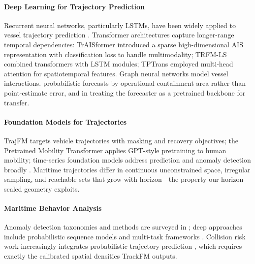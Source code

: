 \documentclass{article}
\begin{document}
\paragraph{Deep Learning for Trajectory Prediction}
Recurrent neural networks, particularly LSTMs, have been widely applied to
vessel trajectory prediction \citep{nguyen2018geotracknet}. Transformer
architectures capture longer-range temporal dependencies: TrAISformer
\citep{nguyen2021traisformer} introduced a sparse high-dimensional AIS
representation with classification loss to handle multimodality; TRFM-LS
\citep{jiang2023trfmls} combined transformers with LSTM modules; TPTrans
\citep{ouyang2024tptrans} employed multi-head attention for spatiotemporal
features. Graph neural networks model vessel interactions.
probabilistic forecasts by operational containment area rather than
point-estimate error, and in treating the forecaster as a pretrained
backbone for transfer.

\paragraph{Foundation Models for Trajectories}
TrajFM \citep{lin2024trajfm} targets vehicle trajectories with masking and
recovery objectives; the Pretrained Mobility Transformer \citep{wu2024pmt}
applies GPT-style pretraining to human mobility; time-series foundation
models address prediction and anomaly detection broadly \citep{jin2024tsfm}.
Maritime trajectories differ in continuous unconstrained space, irregular
sampling, and reachable sets that grow with horizon---the property our
horizon-scaled geometry exploits.

\paragraph{Maritime Behavior Analysis}
Anomaly detection taxonomies and methods are surveyed in
\citet{riveiro2018anomaly}; deep approaches include probabilistic sequence models
\citep{nguyen2018geotracknet} and multi-task frameworks \citep{park2025aisllm}.
Collision risk work increasingly integrates probabilistic trajectory
prediction \citep{jurkus2025collision}, which requires exactly the
calibrated spatial densities TrackFM outputs.
\end{document}

